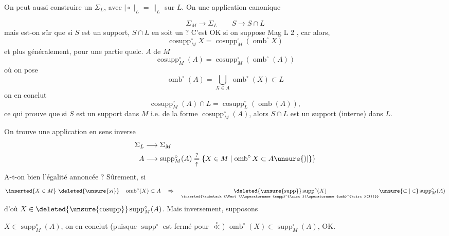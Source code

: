 On peut aussi construire un $\Sigma_L$, avec $\mid\circ\mid_L=\mathrel{\|}_L$ sur $L$. On  une application canonique

\[
\Sigma_M\longrightarrow\Sigma_L\qquad S\longrightarrow S\cap L
\]
mais est-on sûr que si $S$ est un support, $S\cap L$ en soit un ? C'est OK si on suppose Mag L 2  , car alors,
\[
\operatorname{cosupp}^{\circ}_M X=\operatorname{cosupp}^{\circ}_M(\operatorname{omb}^{\circ}X)
\]
et plus généralement, pour une partie quelc. $A$ de $M$
\[
\operatorname{cosupp}^{\circ}_M(A)=\operatorname{cosupp}^{\circ}_M(\operatorname{omb}^{\circ}(A))
\]
où on pose
\[
\operatorname{omb}^{\circ}(A)=\bigcup_{X\in A}\operatorname{omb}^{\circ}(X)\subset L
\]
on en conclut
\[
\operatorname{cosupp}^{\circ}_M(A)\cap L=\operatorname{cosupp}^{\circ}_L(\operatorname{omb}(A)),
\]
 ce qui prouve que si $S$ est un support dans $M$ i.e. de la forme $\operatorname{cosupp}^{\circ}_M(A)$, alors $S\cap L$ est un support (interne) dans $L$.

On trouve une application en sens inverse
\[
\begin{aligned}
\Sigma_L&\longrightarrow\Sigma_M\\
 A&\longrightarrow\operatorname{supp}^{\circ}_M(A)\underset{\uparrow}{\overset{?}{=}}\{X\in M\mid\operatorname{omb}^{\circ}X\subset A\unsure{)|\}}
\end{aligned}
\]
A-t-on bien l'égalité annoncée ? Sûrement, si
\[
\inserted{X\in M}\ \deleted{\unsure{si}}\quad\operatorname{omb}^{\circ}(X)\subset A\quad\Rightarrow\quad
\underset{\inserted{\substack{\Vert\\\operatorname{supp}^{\circ}(\operatorname{omb}^{\circ}(X))}}}{\deleted{\unsure{\operatorname{supp}}}\operatorname{supp}^{\circ}(X)}
\unsure{\subset|\in}\operatorname{supp}^{\circ}_M(A)
\]
d'où $X\in\deleted{\unsure{\operatorname{cosupp}}}\operatorname{supp}^{\circ}_M(A)$. Mais inversement, supposons

$X\in\operatorname{supp}^{\circ}_M(A)$, on en conclut (puisque $\operatorname{supp}^{\circ}$ est fermé pour $\overset{\circ}{\ll}$) $\operatorname{omb}^{\circ}(X)\subset\operatorname{supp}^{\circ}_M(A)$, OK.

